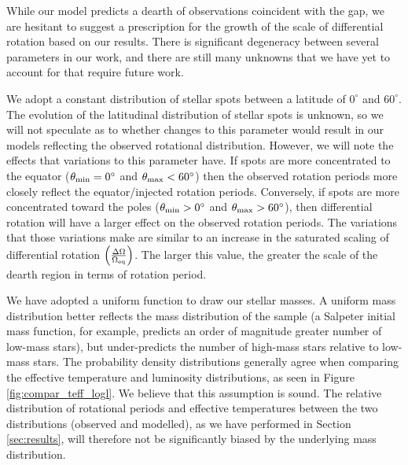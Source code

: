 While our model predicts a dearth of observations coincident with the gap, we are hesitant to suggest a prescription for the growth of the scale of differential rotation based on our results.
There is significant degeneracy between several parameters in our work, and there are still many unknowns that we have yet to account for that require future work.

We adopt a constant distribution of stellar spots between a latitude of $0^{\circ}$ and $60^{\circ}$.
The evolution of the latitudinal distribution of stellar spots is unknown, so we will not speculate as to whether changes to this parameter would result in our models reflecting the observed rotational distribution.
However, we will note the effects that variations to this parameter have.
If spots are more concentrated to the equator ($\theta_{\rm{min}} = 0^{\circ}$ and $\theta_{\rm{max}} < 60^{\circ}$) then the observed rotation periods more closely reflect the equator/injected rotation periods.
Conversely, if spots are more concentrated toward the poles ($\theta_{\rm{min}} > 0^{\circ}$ and $\theta_{\rm{max}} > 60^{\circ}$), then differential rotation will have a larger effect on the observed rotation periods.
The variations that those variations make are similar to an increase in the saturated scaling of differential rotation $\left(\frac{\Delta\Omega}{\Omega_{\rm{eq}}}\right)$.
The larger this value, the greater the scale of the dearth region in terms of rotation period.

We have adopted a uniform function to draw our stellar masses.
A uniform mass distribution better reflects the mass distribution of the \citet{mcquillan_rotation_2014} sample (a Salpeter initial mass function, for example, predicts an order of magnitude greater number of low-mass stars), but under-predicts the number of high-mass stars relative to low-mass stars.
The probability density distributions generally agree when comparing the effective temperature and luminosity distributions, as seen in Figure \ref{fig:compar_teff_logl}.
We believe that this assumption is sound.
The relative distribution of rotational periods and effective temperatures between the two distributions (observed and modelled), as we have performed in Section \ref{sec:results}, will therefore not be significantly biased by the underlying mass distribution.

